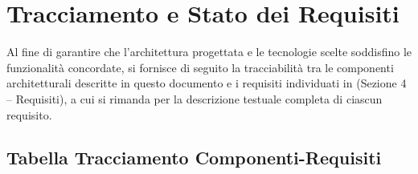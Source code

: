\section{Tracciamento e Stato dei Requisiti}
\label{sec:tracciamento}
Al fine di garantire che l'architettura progettata e le tecnologie scelte soddisfino le funzionalità concordate, si fornisce di seguito la tracciabilità tra le componenti architetturali descritte in questo documento e i requisiti individuati in  (Sezione 4 -- Requisiti), a cui si rimanda per la descrizione testuale completa di ciascun requisito.

\subsection{Tabella Tracciamento Componenti-Requisiti}

